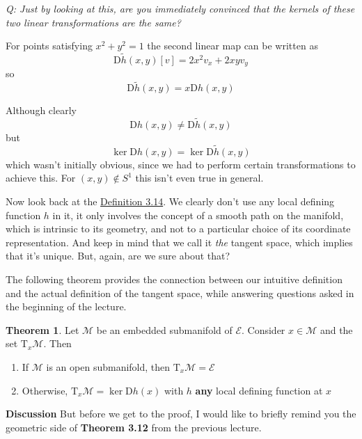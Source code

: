 \documentclass[12pt]{article}
\newcommand*{\T}{\mathrm{T}}
\newcommand*{\D}{\mathrm{D}}
\theoremstyle{definition}
\newtheorem{theorem}{Theorem}[section]
\begin{document}
\textit{Q: Just by looking at this, are you immediately convinced that the kernels of these two linear transformations are the same?}

For points satisfying $x^2 + y^2 = 1$ the second linear map can be written as 
\begin{equation}
    \D\tilde{h}(x,y)[v ] = 2x^2 v_x + 2x y v_y 
\end{equation}
so 
\begin{equation}
    \D\tilde{h}(x, y) = x \D h(x, y) 
\end{equation}

Although clearly 
\begin{equation}
    \D h(x, y) \neq \D\tilde{h}(x, y)
\end{equation}
but 
\begin{equation}
    \ker \D h(x, y) = \ker \D \tilde{h}(x, y)
\end{equation}
which wasn't initially obvious, since we had to perform certain transformations to achieve this. For $(x, y) \notin S^1$ this isn't even true in general. 

Now look back at the \hyperlink{D1}{Definition 3.14}. We clearly don't use any local defining function $h$ in it, it only involves the concept of a smooth path on the manifold, which is intrinsic to its geometry, and not to a particular choice of its coordinate representation. And keep in mind that we call it \textit{the} tangent space, which implies that it's unique. But, again, are we sure about that?

The following theorem provides the connection between our intuitive definition and the actual definition of the tangent space, while answering questions asked in the beginning of the lecture. 
\begin{theorem}
    Let $\mathcal{M}$ be an embedded submanifold of $\mathcal{E}$. Consider $x \in \mathcal{M}$ and the set $\T_x \mathcal{M}$. Then 
    \begin{enumerate}
        \item If $\mathcal{M}$ is an open submanifold, then $\T_x \mathcal{M} = \mathcal{E}$ 
        \item Otherwise, $\T_x \mathcal{M} = \ker \D h(x)$ with $h$ \textbf{any} local defining function at $x$
    \end{enumerate}
\end{theorem}

\noindent \textbf{Discussion} But before we get to the proof, I would like to briefly remind you the geometric side of \textbf{Theorem 3.12} from the previous lecture. 
\end{document}

